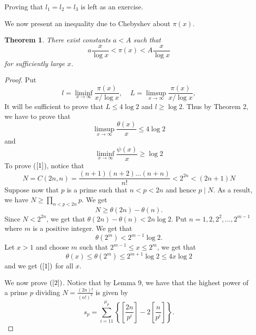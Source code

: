 \documentclass[12pt,letterpaper]{book}
\newtheorem{theorem}{Theorem}
\begin{document}
\par Proving that $l_1=l_2=l_3$ is left as an exercise.

We now present an inequality due to Chebyshev about $\pi(x)$.
\begin{theorem}
There exist constants $a<A$ such that
\begin{equation*}
a\frac{x}{\log x}<\pi(x)<A\frac{x}{\log x}
\end{equation*}
for sufficiently large $x$.
\end{theorem}
\begin{proof}
Put
\begin{equation*}
l=\liminf_{x\rightarrow \infty}\frac{\pi(x)}{x/\log x}, \ \ \ \ \
L=\limsup_{x\rightarrow \infty}\frac{\pi(x)}{x/\log x},
\end{equation*}
It will be sufficient to prove that $L\leq 4 \log 2$ and $l\geq \log
2$.  Thus by Theorem 2, we have to prove that
\begin{equation}\label{1}
\limsup_{x\rightarrow \infty}\frac{\theta(x)}{x}\leq 4 \log 2
\end{equation}
and
\begin{equation}\label{2}
\liminf_{x\rightarrow \infty}\frac{\psi(x)}{x}\geq \log 2
\end{equation}
To prove ($\ref{1}$), notice that
\begin{equation*}
N=C(2n,n)=\frac{(n+1)(n+2)...(n+n)}{n!}<2^{2n}<(2n+1)N
\end{equation*}
Suppose now that $p$ is a prime such that $n<p<2n$ and hence $p\mid
N$. As a result, we have $N \geq \prod_{n<p<2n}p$. We get
\begin{equation*}
N\geq \theta(2n)-\theta(n).
\end{equation*}
Since $N<2^{2n}$, we get that $\theta(2n)-\theta(n)<2n\log 2$. Put
$n=1,2,2^2,...,2^{m-1}$ where $m$ is a positive integer.  We get
that
\begin{equation*}
\theta(2^m)<2^{m-1}\log 2.
\end{equation*}
Let $x>1$  and choose $m$ such that $2^{m-1}\leq x\leq 2^m$, we get
that
\begin{equation*}
\theta(x)\leq \theta(2^m)\leq 2^{m+1}\log 2 \leq 4x\log 2
\end{equation*}
and we get $(\ref{1})$ for all $x$.
\par We now prove $(\ref{2})$.
Notice that by Lemma 9, we have that the highest power of a prime
$p$ dividing $N=\frac{(2n)!}{(n!)^2}$ is given by
\begin{equation*}
s_p=\sum_{i=1
1}^{\mu_p}\left\{\left[\frac{2n}{p^i}\right]-2\left[\frac{n}{p^i}\right]\right\}.

\end{equation*}
\end{proof}
\end{document}
